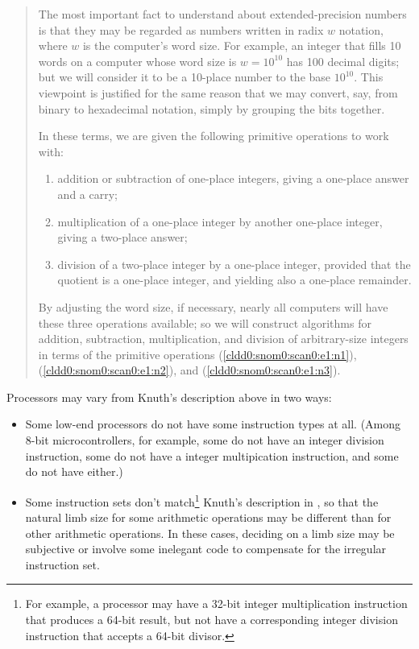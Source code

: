 \begin{em}
\begin{quote}
The most important fact to understand about 
extended-precision numbers is that they may be regarded as 
numbers written in radix $w$ notation, where $w$ is the 
computer's word size.  For example, an integer that fills 10 
words on a computer whose word size is $w=10^{10}$ has 100 
decimal digits; but we will consider it to be a 10-place 
number to the base $10^{10}$.  This viewpoint is justified 
for the same reason that we may convert, say, from binary to 
hexadecimal notation, simply by grouping the bits together.  

In these terms, we are given the following primitive 
operations to work with: 

\begin{enumerate}
\item \label{cldd0:snom0:scan0:e1:n1}addition or subtraction
      of one-place integers, giving a one-place answer and a 
      carry;
\item \label{cldd0:snom0:scan0:e1:n2}multiplication of a
      one-place integer by another one-place integer, giving 
      a two-place answer;
\item \label{cldd0:snom0:scan0:e1:n3}division of a two-place
      integer by a one-place integer, provided that the 
      quotient is a one-place integer, and yielding also a 
      one-place remainder.
\end{enumerate}

By adjusting the word size, if necessary, nearly all 
computers will have these three operations available; so we 
will construct algorithms for addition, subtraction, 
multiplication, and division of arbitrary-size integers in 
terms of the primitive operations 
(\ref{cldd0:snom0:scan0:e1:n1}), 
(\ref{cldd0:snom0:scan0:e1:n2}), and 
(\ref{cldd0:snom0:scan0:e1:n3}).  
\end{quote}
\end{em}

Processors may vary from Knuth's description above in two ways:

\begin{itemize}
\item Some low-end processors do not have some instruction
      types at all.  (Among 8-bit microcontrollers, for 
      example, some do not have an integer division
      instruction, some do not have a integer multipication
      instruction, and
      some do not have either.)
\item Some instruction sets don't match\footnote{For
      example, a processor may have a 32-bit integer 
      multiplication instruction that produces a
      64-bit result, but not have a corresponding integer
      division instruction
      that accepts a 64-bit divisor.} Knuth's description
      in \cite[pp.
      265-266]{bibref:b:TaocpVolume2}, so that the natural
      limb size for some
      arithmetic operations may be different than for other
      arithmetic
      operations.  In these cases, deciding on a limb size
      may be subjective or
      involve some inelegant code to compensate for the
      irregular instruction
      set.
\end{itemize}

